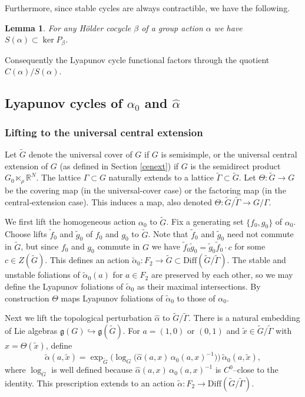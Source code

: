\documentclass[11pt]{amsart}
\numberwithin{equation}{section}
\newcommand{\R}{\mathbb{R}}
\theoremstyle{plain}
\newtheorem{lem}[thm]{Lemma}
\begin{document}
Furthermore, since stable cycles are always contractible, we have the following.
\begin{lem}\label{lem:stableinkernel}
For any H\"older cocycle $\beta$ of a group action $\alpha$ we have
$S(\alpha)\subset\ker P_\beta$.
\end{lem}

Consequently the Lyapunov cycle functional factors through the quotient
$C(\alpha)/S(\alpha)$.

\subsection{Lyapunov cycles of $\alpha_0$ and $\hat\alpha$}

\subsubsection{Lifting to the universal central extension}
Let $\tilde G$ denote the universal cover of $G$ if $G$ is semisimple,
or the universal central extension of $G$ (as defined in Section
\ref{cenext}) if $G$ is the semidirect product $G_0\ltimes_\rho\R^N$.
The lattice $\Gamma\subset G$ naturally extends to a lattice
$\tilde\Gamma\subset\tilde G$. Let $\Theta:\tilde G\to G$ be the
covering map (in the universal‑cover case) or the factoring map (in the
central‑extension case). This induces a map, also denoted
$\Theta:\tilde G/\tilde\Gamma\to G/\Gamma$.

We first lift the homogeneous action $\alpha_0$ to $\tilde G$. Fix a
generating set $\{f_0,g_0\}$ of $\alpha_0$. Choose lifts $\tilde f_0$ and
$\tilde g_0$ of $f_0$ and $g_0$ to $\tilde G$. Note that $\tilde f_0$
and $\tilde g_0$ need not commute in $\tilde G$, but since $f_0$ and
$g_0$ commute in $G$ we have
$\tilde f_0\tilde g_0=\tilde g_0\tilde f_0\cdot c$ for some
$c\in Z(\tilde G)$. This defines an action
$\tilde\alpha_0:F_2\to\tilde G\subset\mathrm{Diff}(\tilde G/\tilde\Gamma)$.
The stable and unstable foliations of $\tilde\alpha_0(a)$ for
$a\in F_2$ are preserved by each other, so we may define the Lyapunov
foliations of $\tilde\alpha_0$ as their maximal intersections. By
construction $\Theta$ maps Lyapunov foliations of $\tilde\alpha_0$ to
those of $\alpha_0$.

Next we lift the topological perturbation $\hat\alpha$ to
$\tilde G/\tilde\Gamma$. There is a natural embedding of Lie algebras
$\mathfrak g(G)\hookrightarrow\mathfrak g(\tilde G)$. For
$a=(1,0)$ or $(0,1)$ and $\tilde x\in\tilde G/\tilde\Gamma$ with
$x=\Theta(\tilde x)$, define
\[
\tilde\alpha(a,\tilde x)
=\exp_{\tilde G}\Big(\log_{G}\big(\hat\alpha(a,x)\,\alpha_0(a,x)^{-1}\big)\Big)\,
\tilde\alpha_0(a,\tilde x),
\]
where $\log_G$ is well defined because $\hat\alpha(a,x)\,\alpha_0(a,x)^{-1}$
is $C^0$–close to the identity. This prescription extends to an action
$\tilde\alpha:F_2\to\mathrm{Diff}(\tilde G/\tilde\Gamma)$.
\end{document}
